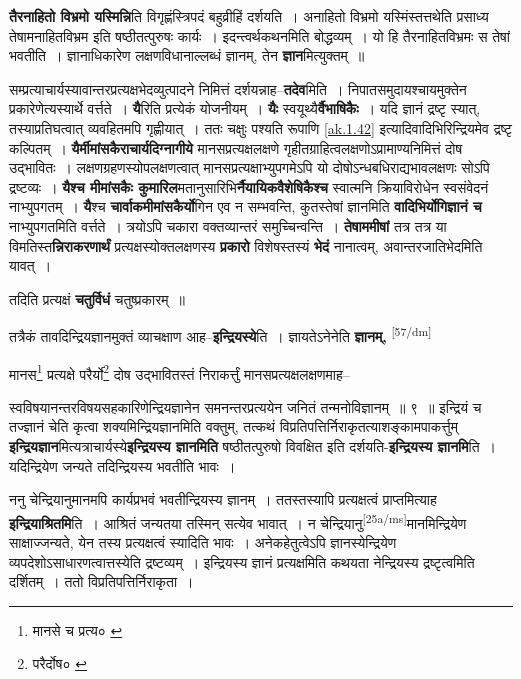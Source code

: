 \documentclass[article,12pt,a4paper]{memoir}
\begin{document}
	  \pstart \textbf{तैरनाहितो विभ्रमो यस्मिन्नि}ति विगृह्णंस्त्रिपदं बहुव्रीहिं दर्शयति । अनाहितो विभ्रमो यस्मिंस्तत्तथेति प्रसाध्य तेषामनाहितविभ्रम इति षष्ठीतत्पुरुषः कार्यः । इदन्त्वर्थकथनमिति बोद्धव्यम् । यो हि तैरनाहितविभ्रमः स तेषां भवतीति । ज्ञानाधिकारेण लक्षणविधानाल्लब्धं ज्ञानम्, तेन \textbf{ज्ञान}मित्युक्तम् ॥
	\pend
      

	  \pstart सम्प्रत्याचार्यस्यावान्तरप्रत्यक्षभेदव्युत्पादने निमित्तं दर्शयन्नाह--\textbf{तदेव}मिति । निपातसमुदायश्चायमुक्तेन प्रकारेणेत्यस्यार्थे वर्त्तते । \textbf{यै}रिति प्रत्येकं योजनीयम् । \textbf{यैः} स्वयूथ्यै\textbf{र्वैभाषिकैः} । यदि ज्ञानं द्रष्टृ स्यात्, तस्याप्रतिघत्वात् व्यवहितमपि गृह्णीयात् । ततः चक्षुः पश्यति रूपाणि \cref{ak.1.42} इत्यादिवादिभिरिन्द्रियमेव द्रष्टृ कल्पितम् । \textbf{यैर्मीमांसकैराचार्यदिग्नागीये} मानसप्रत्यक्षलक्षणे गृहीतग्राहित्वलक्षणोऽप्रामाण्यनिमित्तं दोष उद्भावितः । लक्षणग्रहणस्योपलक्षणत्वात् मानसप्रत्यक्षाभ्युपगमेऽपि यो दोषोऽन्धबधिराद्यभावलक्षणः सोऽपि द्रष्टव्यः । \textbf{यैश्च मीमांसकैः कुमारिल}मतानुसारिभि\textbf{र्नैयायिकवैशेषिकैश्च} स्वात्मनि क्रियाविरोधेन स्वसंवेदनं नाभ्युपगतम् । \textbf{यै}श्च \textbf{चार्वाकमीमांसकैर्यो}गिन एव न सम्भवन्ति, कुतस्तेषां ज्ञानमिति \textbf{वादिभिर्योगिज्ञानं च} नाभ्युपगतमिति वर्त्तते । त्रयोऽपि चकारा वक्तव्यान्तरं समुच्चिन्वन्ति । \textbf{तेषाममीषां} तत्र तत्र या विमतिस्त\textbf{न्निराकरणार्थं} प्रत्यक्षस्योक्तलक्षणस्य \textbf{प्रकारो} विशेषस्तस्यं \textbf{भेदं} नानात्वम्, अवान्तरजातिभेदमिति यावत् ।
	\pend
      

	  \pstart तदिति प्रत्यक्षं \textbf{चतुर्विधं} चतुष्प्रकारम् ॥
	\pend
      

	  \pstart तत्रैकं तावदिन्द्रियज्ञानमुक्तं व्याचक्षाण आह--\textbf{इन्द्रियस्ये}ति । ज्ञायतेऽनेनेति \textbf{ज्ञानम्,}  \leavevmode\textsuperscript{\rmlatinfont\tiny [57/dm]} 
	  
	मानस\footnote{मानसे च प्रत्य० \cite{dp-msB} \cite{dp-msD}} प्रत्यक्षे परैर्यो\footnote{परैर्दोष० \cite{dp-msD}} दोष उद्भावितस्तं निराकर्त्तुं मानसप्रत्यक्षलक्षणमाह-- 
	  
	स्वविषयानन्तरविषयसहकारिणेन्द्रियज्ञानेन समनन्तरप्रत्ययेन जनितं तन्मनोविज्ञानम् ॥ ९ ॥ इन्द्रियं च तज्ज्ञानं चेति कृत्वा शक्यमिन्द्रियज्ञानमिति वक्तुम्, तत्कथं विप्रतिपत्तिर्निराकृतत्याशङ्कामपाकर्त्तुम् \textbf{इन्द्रियज्ञान}मित्यत्राचार्यस्ये\textbf{इन्द्रियस्य ज्ञानमिति} षष्ठीतत्पुरुषो विवक्षित इति दर्शयति-\textbf{इन्द्रियस्य ज्ञानमि}ति । यदिन्द्रियेण जन्यते तदिन्द्रियस्य भवतीति भावः ।
	\pend
      

	  \pstart ननु चेन्द्रियानुमानमपि कार्यप्रभवं भवतीन्द्रियस्य ज्ञानम् । ततस्तस्यापि प्रत्यक्षत्वं प्राप्तमित्याह \textbf{इन्द्रियाश्रितमि}ति । आश्रितं जन्यतया तस्मिन् सत्येव भावात् । न चेन्द्रियानु\leavevmode\textsuperscript{\rmlatinfont\tiny [25a/ms]}मानमिन्द्रियेण साक्षाज्जन्यते, येन तस्य प्रत्यक्षत्वं स्यादिति भावः । अनेकहेतुत्वेऽपि ज्ञानस्येन्द्रियेण व्यपदेशोऽसाधारणत्वात्तस्येति द्रष्टव्यम् । इन्द्रियस्य ज्ञानं प्रत्यक्षमिति कथयता नेन्द्रियस्य द्रष्टृत्वमिति दर्शितम् । ततो विप्रतिपत्तिर्निराकृता ।
	\pend
      
\end{document}
